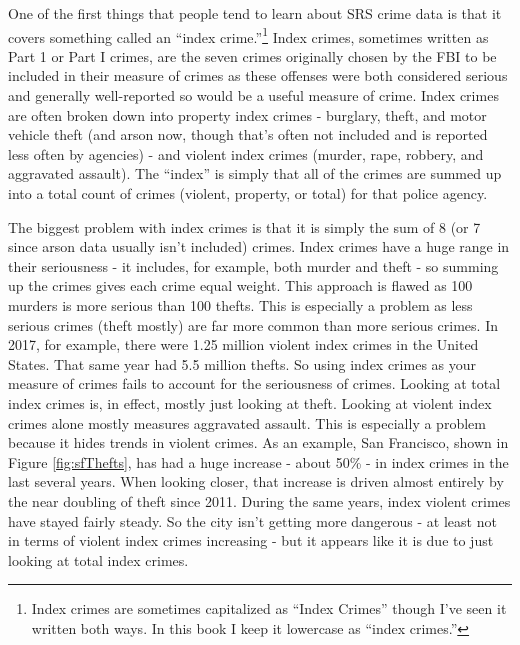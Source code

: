 \documentclass[
  12pt,
  openany]{book}
\begin{document}
One of the first things that people tend to learn about SRS crime data is that it covers something called an ``index crime.''\footnote{Index crimes are sometimes capitalized as ``Index Crimes'' though I've seen it written both ways. In this book I keep it lowercase as ``index crimes.''} Index crimes, sometimes written as Part 1 or Part I crimes, are the seven crimes originally chosen by the FBI to be included in their measure of crimes as these offenses were both considered serious and generally well-reported so would be a useful measure of crime. Index crimes are often broken down into property index crimes - burglary, theft, and motor vehicle theft (and arson now, though that's often not included and is reported less often by agencies) - and violent index crimes (murder, rape, robbery, and aggravated assault). The ``index'' is simply that all of the crimes are summed up into a total count of crimes (violent, property, or total) for that police agency.

The biggest problem with index crimes is that it is simply the sum of 8 (or 7 since arson data usually isn't included) crimes. Index crimes have a huge range in their seriousness - it includes, for example, both murder and theft - so summing up the crimes gives each crime equal weight. This approach is flawed as 100 murders is more serious than 100 thefts. This is especially a problem as less serious crimes (theft mostly) are far more common than more serious crimes. In 2017, for example, there were 1.25 million violent index crimes in the United States. That same year had 5.5 million thefts. So using index crimes as your measure of crimes fails to account for the seriousness of crimes. Looking at total index crimes is, in effect, mostly just looking at theft. Looking at violent index crimes alone mostly measures aggravated assault. This is especially a problem because it hides trends in violent crimes. As an example, San Francisco, shown in Figure \ref{fig:sfThefts}, has had a huge increase - about 50\% - in index crimes in the last several years. When looking closer, that increase is driven almost entirely by the near doubling of theft since 2011. During the same years, index violent crimes have stayed fairly steady. So the city isn't getting more dangerous - at least not in terms of violent index crimes increasing - but it appears like it is due to just looking at total index crimes.
\end{document}
